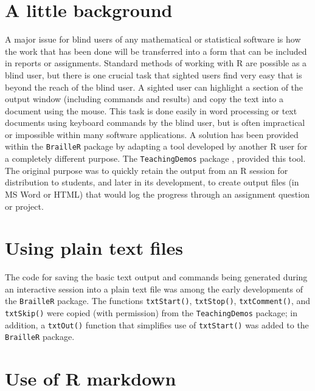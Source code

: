 \documentclass[
]{book}
\begin{document}
\hypertarget{a-little-background}{%
\section{A little background}\label{a-little-background}}

A major issue for blind users of any mathematical or statistical software is how the work that has been done will be transferred into a form that can be included in reports or assignments.
Standard methods of working with R are possible as a blind user, but there is one crucial task that sighted users find very easy that is beyond the reach of the blind user.
A sighted user can highlight a section of the output window (including commands and results) and copy the text into a document using the mouse. This task is done easily in word processing or text documents using keyboard commands by the blind user, but is often impractical or impossible within many software applications. A solution has been provided within the \texttt{BrailleR} package by adapting a tool developed by another R user for a completely different purpose. The \texttt{TeachingDemos} package \citep{Rpkg-TeachingDemos}, provided this tool. The original purpose was to quickly retain the output from an R session for distribution to students, and later in its
development, to create output files (in MS Word or HTML) that would log the progress through an assignment question or project.

\hypertarget{using-plain-text-files}{%
\section{Using plain text files}\label{using-plain-text-files}}

The code for saving the basic text output and commands being generated during an interactive session into a plain text file was among the early developments of the \texttt{BrailleR} package.
The functions \texttt{txtStart()}, \texttt{txtStop()}, \texttt{txtComment()}, and \texttt{txtSkip()} were copied (with permission) from the \texttt{TeachingDemos} package; in addition, a \texttt{txtOut()} function that simplifies use of \texttt{txtStart()} was added to the \texttt{BrailleR} package.

\hypertarget{use-of-r-markdown}{%
\section{Use of R markdown}\label{use-of-r-markdown}}
\end{document}
